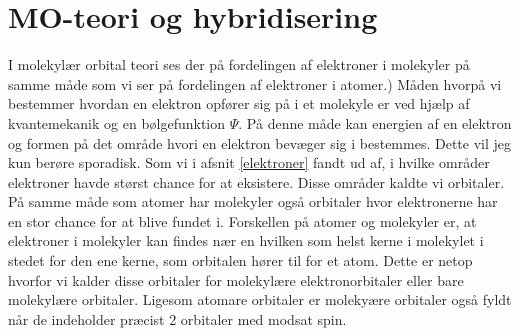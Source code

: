 \section{MO-teori og hybridisering}
I molekylær orbital teori ses der på fordelingen af elektroner i molekyler på samme måde som vi ser på fordelingen af elektroner i atomer.) Måden hvorpå vi bestemmer hvordan en elektron opfører sig på i et molekyle er ved hjælp af kvantemekanik og en bølgefunktion $\Psi$. På denne måde kan energien af en elektron og formen på det område hvori en elektron bevæger sig i bestemmes. Dette vil jeg kun berøre sporadisk. Som vi i afsnit \ref{elektroner} fandt ud af, i hvilke områder elektroner havde størst chance for at eksistere. Disse områder kaldte vi orbitaler. På samme måde som atomer har molekyler også orbitaler hvor elektronerne har en stor chance for at blive fundet i. Forskellen på atomer og molekyler er, at elektroner i molekyler kan findes nær en hvilken som helst kerne i molekylet i stedet for den ene kerne, som orbitalen hører til for et atom. Dette er netop hvorfor vi kalder disse orbitaler for molekylære elektronorbitaler eller bare molekylære orbitaler. Ligesom atomare orbitaler er molekyære orbitaler også fyldt når de indeholder præcist 2 orbitaler med modsat spin. 
\\

